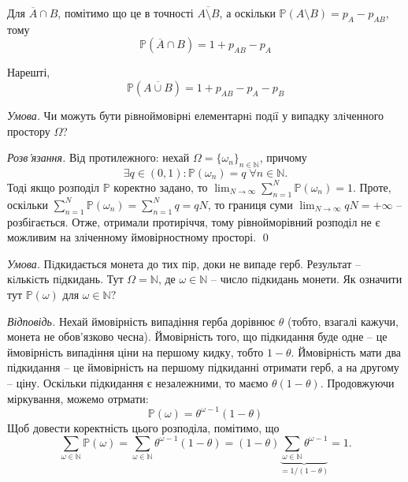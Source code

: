 \documentclass[oneside,solution]{karazin-prob-theory-assign}
\begin{document}
Для $\overline{A} \cap B$, помітимо що це в точності $\overline{A \setminus B}$, а оскільки $\mathbb{P}(A \setminus B)=p_A-p_{AB}$, тому
\begin{equation}
    \boxed{\mathbb{P}(\overline{A} \cap B)=1+p_{AB}-p_A}
\end{equation}

Нарешті,
\begin{equation}
    \boxed{\mathbb{P}(\overline{A \cup B}) = 1 + p_{AB} - p_A - p_B}
\end{equation}


\hspace{20px}\textit{Умова.} Чи можуть бути рiвноймовiрнi елементарнi подiї у випадку злiченного простору $\Omega$?

\textit{Розв'язання.} Від протилежного: нехай $\Omega = \{\omega_n\}_{n \in \mathbb{N}}$, причому 
\begin{equation}
\exists q \in (0,1): \mathbb{P}(\omega_n)=q \; \forall n \in \mathbb{N}.
\end{equation}
Тоді якщо розподіл $\mathbb{P}$ коректно задано, то $\lim_{N \to \infty}\sum_{n=1}^N \mathbb{P}(\omega_n) = 1$. Проте, оскільки $\sum_{n=1}^N \mathbb{P}(\omega_n)=\sum_{n=1}^N q = qN$, то границя суми $\lim_{N \to \infty}qN = +\infty$ -- розбігається. Отже, отримали протиріччя, тому рівнойморівний розподіл не є можливим на зліченному ймовірностному просторі. \qed


\hspace{20px}\textit{Умова.} Пiдкидається монета до тих пiр, доки не випаде герб. Результат -- кiлькiсть пiдкидань. Тут $\Omega = \mathbb{N}$, де $\omega \in \mathbb{N}$ -- число пiдкидань монети. Як означити тут $\mathbb{P}(\omega)$ для $\omega \in \mathbb{N}?$

\textit{Відповідь.} Нехай ймовірність випадіння герба дорівнює $\theta$ (тобто, взагалі кажучи, монета не обов'язково чесна). Ймовірність того, що підкидання буде одне -- це ймовірність випадіння ціни на першому кидку, тобто $1-\theta$. Ймовірність мати два підкидання -- це ймовірність на першому підкиданні отримати герб, а на другому -- ціну. Оскільки підкидання є незалежними, то маємо $\theta(1-\theta)$. Продовжуючи міркування, можемо отрмати:
\begin{equation}
    \mathbb{P}(\omega) = \theta^{\omega-1}(1-\theta)
\end{equation}
Щоб довести коректність цього розподіла, помітимо, що
\begin{equation}
    \sum_{\omega \in \mathbb{N}}\mathbb{P}(\omega) = \sum_{\omega \in \mathbb{N}}\theta^{\omega-1}(1-\theta) = (1-\theta)\underbrace{\sum_{\omega \in \mathbb{N}}\theta^{\omega-1}}_{=1/(1-\theta)} = 1.
\end{equation}
\end{document}

